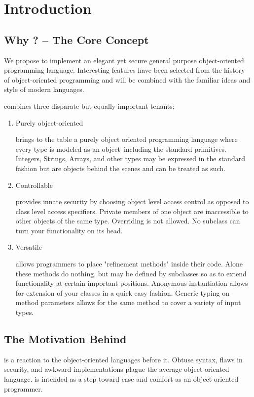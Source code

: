 \section{Introduction}
\subsection{Why \Lang{}? -- The Core Concept}
We propose to implement an elegant yet secure general purpose object-oriented programming language. Interesting features have been selected from the history of object-oriented programming and will be combined with the familiar ideas and style of modern languages.

\Lang{} combines three disparate but equally important tenants:


\begin{enumerate}
\item Purely object-oriented 
    
    \Lang{} brings to the table a purely object oriented programming language where every type is
    modeled as an object--including the standard primitives. Integers, Strings, Arrays, and other types may be expressed in the standard fashion but are objects behind the scenes and can be treated as such.

\item Controllable

   \Lang{} provides innate security by choosing object level access
   control as opposed to class level access specifiers. Private members of one object
   are inaccessible to other objects of the same type. Overriding is not allowed.
   No subclass can turn your functionality on its head.

\item Versatile

    \Lang{} allows programmers to place "refinement methods" inside their code.
    Alone these methods do nothing, but may be defined by subclasses so as to extend
    functionality at certain important positions. Anonymous instantiation allows for
    extension of your classes in a quick easy fashion. Generic typing on method
    parameters allows for the same method to cover a variety of input types.
\end{enumerate}

\subsection{The Motivation Behind \Lang{}}
\Lang{} is a reaction to the object-oriented languages before it.
Obtuse syntax, flaws in security, and awkward implementations plague
the average object-oriented language. \Lang{} is intended as a step
toward ease and comfort as an object-oriented programmer.


